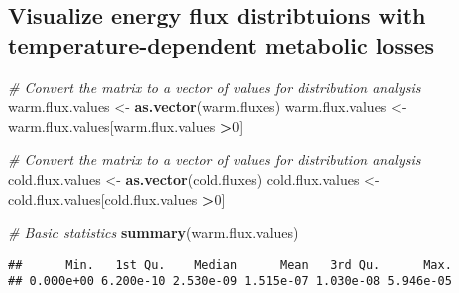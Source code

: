 \documentclass[
]{article}
\newenvironment{Shaded}{\begin{snugshade}}{\end{snugshade}}
\newcommand{\CommentTok}[1]{\textcolor[rgb]{0.56,0.35,0.01}{\textit{#1}}}
\newcommand{\DecValTok}[1]{\textcolor[rgb]{0.00,0.00,0.81}{#1}}
\newcommand{\FunctionTok}[1]{\textcolor[rgb]{0.13,0.29,0.53}{\textbf{#1}}}
\newcommand{\NormalTok}[1]{#1}
\newcommand{\OtherTok}[1]{\textcolor[rgb]{0.56,0.35,0.01}{#1}}
\newcommand{\SpecialCharTok}[1]{\textcolor[rgb]{0.81,0.36,0.00}{\textbf{#1}}}
\begin{document}
\begin{Shaded}
\end{Shaded}

\subsection{Visualize energy flux distribtuions with
temperature-dependent metabolic
losses}\label{visualize-energy-flux-distribtuions-with-temperature-dependent-metabolic-losses}

\begin{Shaded}
\begin{Highlighting}[]
\CommentTok{\# Convert the matrix to a vector of values for distribution analysis}
\NormalTok{warm.flux.values }\OtherTok{\textless{}{-}} \FunctionTok{as.vector}\NormalTok{(warm.fluxes)}
\NormalTok{warm.flux.values }\OtherTok{\textless{}{-}}\NormalTok{ warm.flux.values[warm.flux.values }\SpecialCharTok{\textgreater{}}\DecValTok{0}\NormalTok{]}

\CommentTok{\# Convert the matrix to a vector of values for distribution analysis}
\NormalTok{cold.flux.values }\OtherTok{\textless{}{-}} \FunctionTok{as.vector}\NormalTok{(cold.fluxes)}
\NormalTok{cold.flux.values }\OtherTok{\textless{}{-}}\NormalTok{ cold.flux.values[cold.flux.values }\SpecialCharTok{\textgreater{}}\DecValTok{0}\NormalTok{]}

\CommentTok{\# Basic statistics}
\FunctionTok{summary}\NormalTok{(warm.flux.values)}
\end{Highlighting}
\end{Shaded}

\begin{verbatim}
##      Min.   1st Qu.    Median      Mean   3rd Qu.      Max. 
## 0.000e+00 6.200e-10 2.530e-09 1.515e-07 1.030e-08 5.946e-05
\end{verbatim}
\end{document}
